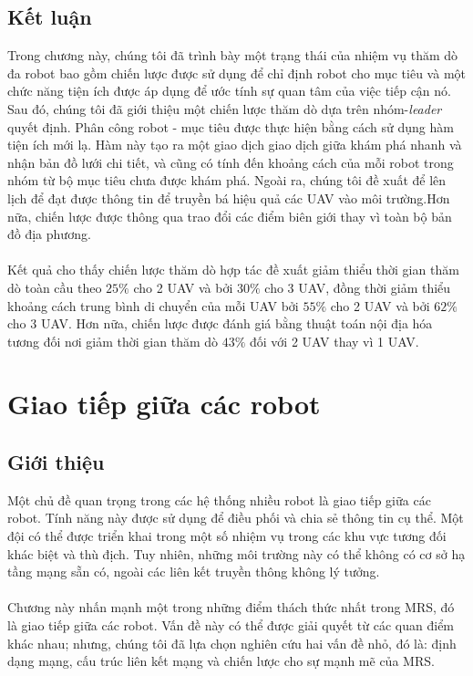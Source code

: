 \documentclass[11pt,openany]{book}
\begin{document}
\section{Kết luận}
Trong chương này, chúng tôi đã trình bày một trạng thái của nhiệm vụ thăm dò đa robot bao gồm chiến lược được sử dụng để chỉ định robot cho mục tiêu và một chức năng tiện ích được áp dụng để ước tính sự quan tâm của việc tiếp cận nó. Sau đó, chúng tôi đã giới thiệu một chiến lược thăm dò dựa trên nhóm-\textit{leader} quyết định. Phân công robot - mục tiêu được thực hiện bằng cách sử dụng hàm tiện ích mới lạ. Hàm này tạo ra một giao dịch giao dịch giữa khám phá nhanh và nhận bản đồ lưới chi tiết, và cũng có tính đến khoảng cách của mỗi robot trong nhóm từ bộ mục tiêu chưa được khám phá. Ngoài ra, chúng tôi đề xuất để lên lịch để đạt được thông tin để truyền bá hiệu quả các UAV vào môi trường.Hơn nữa, chiến lược được thông qua trao đổi các điểm biên giới thay vì toàn bộ bản đồ địa phương.\\\\
Kết quả cho thấy chiến lược thăm dò hợp tác đề xuất giảm thiểu thời gian thăm dò toàn cầu theo $25\%$ cho 2 UAV và bởi $30\%$ cho 3 UAV, đồng thời giảm thiểu khoảng cách trung bình di chuyển của mỗi UAV bởi $55\%$ cho 2 UAV và bởi $62\%$ cho 3 UAV. Hơn nữa, chiến lược được đánh giá bằng thuật toán nội địa hóa tương đối nơi giảm thời gian thăm dò $43\%$ đối với 2 UAV thay vì 1 UAV.
\chapter{Giao tiếp giữa các robot}
\section{Giới thiệu}
Một chủ đề quan trọng trong các hệ thống nhiều robot là giao tiếp giữa các robot. Tính năng này được sử dụng để điều phối và chia sẻ thông tin cụ thể. Một đội có thể được triển khai trong một số nhiệm vụ trong các khu vực tương đối khác biệt và thù địch. Tuy nhiên, những môi trường này có thể không có cơ sở hạ tầng mạng sẵn có, ngoài các liên kết truyền thông không lý tưởng.\\\\
Chương này nhấn mạnh một trong những điểm thách thức nhất trong MRS, đó là giao tiếp giữa các robot. Vấn đề này có thể được giải quyết từ các quan điểm khác nhau; nhưng, chúng tôi đã lựa chọn nghiên cứu hai vấn đề nhỏ, đó là: định dạng mạng, cấu trúc liên kết mạng và chiến lược cho sự mạnh mẽ của MRS.
\end{document}
